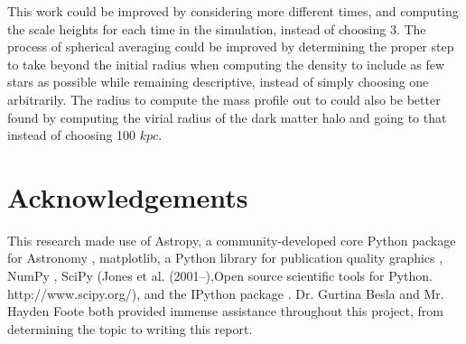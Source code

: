 \documentclass[linenumbers]{aastex631}
\begin{document}
This work could be improved by considering more different times, and computing the scale heights for each time in the simulation, instead of choosing 3. The process of spherical averaging could be improved by determining the proper step to take beyond the initial radius when computing the density to include as few stars as possible while remaining descriptive, instead of simply choosing one arbitrarily. The radius to compute the mass profile out to could also be better found by computing the virial radius of the dark matter halo and going to that instead of choosing 100 $kpc$.

\section{Acknowledgements}
This research made use of Astropy, a community-developed core Python package for Astronomy \citep{2018AJ....156..123A, 2013A&A...558A..33A}, matplotlib, a Python library for publication quality graphics \citep{Hunter:2007}, NumPy \citep{2011CSE....13b..22V}, SciPy (Jones et al. (2001–),Open source scientific tools for Python. http://www.scipy.org/), and the IPython package \citep{2007CSE.....9c..21P}. Dr. Gurtina Besla and Mr. Hayden Foote both provided immense assistance throughout this project, from determining the topic to writing this report.

\end{document}
